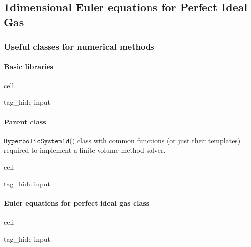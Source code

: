 \documentclass[letterpaper,10pt,english]{jupyterBook}
\begin{document}
\subsection{1\sphinxhyphen{}dimensional Euler equations for Perfect Ideal Gas}
\label{\detokenize{ch/pde/euler-1d:dimensional-euler-equations-for-perfect-ideal-gas}}\label{\detokenize{ch/pde/euler-1d:pde-fvm-hyperbolic-examples-euler-1d}}\label{\detokenize{ch/pde/euler-1d::doc}}

\subsubsection{Useful classes for numerical methods}
\label{\detokenize{ch/pde/euler-1d:useful-classes-for-numerical-methods}}

\paragraph{Basic libraries}
\label{\detokenize{ch/pde/euler-1d:basic-libraries}}
\begin{sphinxuseclass}{cell}
\begin{sphinxuseclass}{tag_hide-input}
\end{sphinxuseclass}
\end{sphinxuseclass}

\paragraph{Parent class}
\label{\detokenize{ch/pde/euler-1d:parent-class}}
\sphinxAtStartPar
\(\texttt{HyperbolicSystem1d()}\) class with common functions (or just their templates) required to implement a finite volume method solver.

\begin{sphinxuseclass}{cell}
\begin{sphinxuseclass}{tag_hide-input}
\end{sphinxuseclass}
\end{sphinxuseclass}

\paragraph{Euler equations for perfect ideal gas class}
\label{\detokenize{ch/pde/euler-1d:euler-equations-for-perfect-ideal-gas-class}}
\begin{sphinxuseclass}{cell}
\begin{sphinxuseclass}{tag_hide-input}
\end{sphinxuseclass}
\end{sphinxuseclass}
\end{document}
